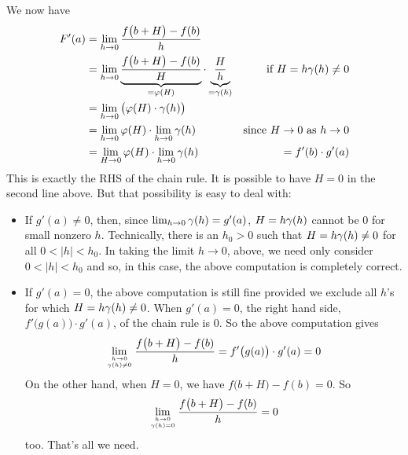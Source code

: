 We now have
\begin{align*}
  F'(a)
  &= \lim_{h \to 0} \frac{f\big(b + H\big)-f(b)}{h} \\
  &= \lim_{h \to 0}
    \underbrace{\frac{f\big(b + H\big)-f(b)}{H}}_{= \varphi(H) } \cdot
    \underbrace{\frac{H}{h}}_{ = \gamma(h)}
& \text{if $H= h \gamma(h)\ne 0$} \\
  &= \lim_{h \to 0}\big( \varphi(H) \cdot \gamma(h) \big) \\
  &= \lim_{h \to 0} \varphi(H) \cdot \lim_{h \to 0} \gamma(h)  & \text{since $H\to0$
as $h\to 0$}\\
  &= \lim_{H \to 0} \varphi(H) \cdot \lim_{h \to 0} \gamma(h)
  &= f'(b) \cdot g'(a)
\end{align*}
This is exactly the RHS of the chain rule. It is possible to have $H=0$ in the 
second line above. But that possibility is easy to deal with:
\begin{itemize} \itemsep1pt \parskip0pt 
\item
If $g'(a)\ne 0$, then, since $\lim_{h \to 0} \gamma(h) = g'(a)$, 
$H= h \gamma(h)$ cannot be $0$ for small nonzero $h$. Technically, there is an
$h_0>0$ such that $H= h \gamma(h)\ne 0$ for all $0<|h|<h_0$. In taking the limit
$h\to 0$, above, we need only consider $0<|h|<h_0$ and so, in this case, 
the above computation is completely correct. 
\item 
If $g'(a)=0$, the above computation is still fine provided we exclude all $h$'s 
for which $H= h \gamma(h)\ne 0$. When $g'(a)=0$, the right hand side, $f'\big(g(a)\big) \cdot g'(a)$, of the chain rule is $0$. 
So the above computation gives  
\begin{equation*}
\lim_{\genfrac{}{}{0pt}{}{h \to 0}{\tg(h)\ne 0}} \frac{f\big(b + H\big)-f(b)}{h}
=f'\big(g(a)\big) \cdot g'(a) = 0
\end{equation*} 
On the other hand, when $H=0$, we have $f\big(b + H\big)-f(b)=0$. So
\begin{equation*}
\lim_{\genfrac{}{}{0pt}{}{h \to 0}{\tg(h) = 0}} \frac{f\big(b + H\big)-f(b)}{h}
=0
\end{equation*}
too. That's all we need.
\end{itemize}



